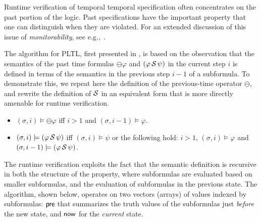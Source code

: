 Runtime verification of temporal temporal specification often
concentrates on the past portion of the logic.  Past specifications have the important property that one can distinguish when they are violated. For an extended discussion of this issue of {\em monitorability}, see e.g.,~\cite{Ugly,FFM}.

The algorithm for PLTL, first presented in \cite{HR}, 
is based on the observation that the semantics of the 
past time formulas $\ominus \varphi$ and $(\varphi\, {\cal S} \,\psi)$ in the current step $i$ is defined in terms of the semantics
in the previous step $i - 1$ of a subformula.
To demonstrate this, we repeat here the definition of the previous-time
operator $\ominus$, and rewrite the definition
of ${\cal S}$ in an equivalent form that is
more directly amenable for runtime verification.

\begin{itemize}
\item $( \sigma , i) \models \ominus \varphi$ iff $i > 1$ and $(\sigma, i-1) \models \varphi$.
\item $(\sigma , i) \models (\varphi \, {\cal S} \, \psi)$ iff $(\sigma , i) \models \psi$ or the following hold: $i>1$,
$( \sigma , i)  \models \varphi$ and 
$(\sigma , i-1 ) \models ( \varphi \, {\cal S} \, \psi )$.
\end{itemize}

The runtime verification exploits the fact that
the semantic definition is recursive in both the structure of the property, where subformulas
are evaluated based on smaller subformulas, and the
evaluation of subformulas in the previous state.
The algorithm, shown below, operates on two vectors (arrays) of values indexed by subformulas:  $\mathsf{pre}$ that summarizes the truth values of the
subformulas just {\em before} the new state, and $\mathsf{now}$ for the {\em current} state.

